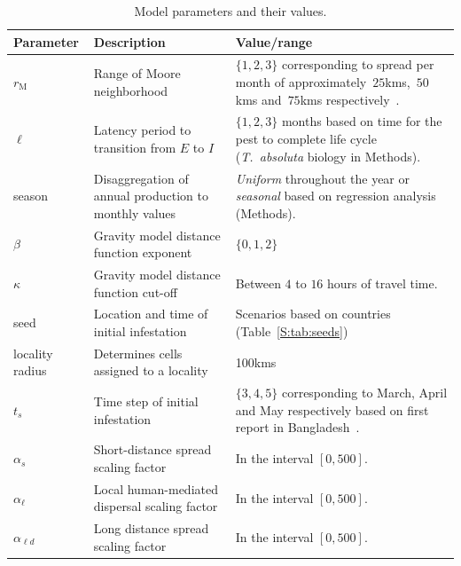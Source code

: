 \documentclass[11pt]{article}
\newcommand{\tuta}{\emph{T.~absoluta}}
\newcommand{\infest}{\rho}
\newcommand{\suitable}{\epsilon}
\newcommand{\asd}{\alpha_s}
\newcommand{\afm}{\alpha_{\ell}}
\newcommand{\ald}{\alpha_{\ell d}}
\newcommand{\mooreRange}{r_\mathrm{M}}
\theoremstyle{definition}
\begin{document}
\begin{table}[t]
\caption{Model parameters and their values.\label{tab:param}}
    \centering
	\small
{} %
    \begin{tabular}{p{}p{}p{}}
		\hline		
		Parameter & Description & Value/range \\
\hline		
\hline
$\mooreRange$ & Range of Moore neighborhood & $\{1,2,3\}$ corresponding to
spread per month of 
approximately~$25$kms,~$50$kms and~$75$kms
respectively~\cite{guimapi2016modeling,martins2018assessing}. \\
$\ell$ & Latency period to transition from $E$ to $I$ & $\{1,2,3\}$ months
based on time for the pest to complete life cycle (\tuta{} biology in
Methods). \\
season & Disaggregation of annual production to monthly values
& \emph{Uniform} throughout the year or \emph{seasonal} based on regression
analysis (Methods). \\
$\beta$ & Gravity model distance function exponent & $\{0,1,2\}$ \\
$\kappa$ & Gravity model distance function cut-off & Between $4$ to $16$ hours
of travel time. \\
seed & Location and time of initial infestation & Scenarios based on
countries (Table~\ref{S:tab:seeds})\\
locality radius & Determines cells assigned to a locality & 100kms \\\hline
$t_s$ & Time step of initial infestation & $\{3,4,5\}$ corresponding
to March, April and May respectively based on first report in
Bangladesh~\cite{hossain2016first}. \\
$\asd$ & Short-distance spread scaling factor & In the interval $[0,500]$.\\
$\afm$ & Local human-mediated dispersal scaling factor & In the interval $[0,500]$.\\
$\ald$ & Long distance spread scaling factor & In the interval $[0,500]$.\\
\hline
\end{tabular}
\end{table}
\end{document}
